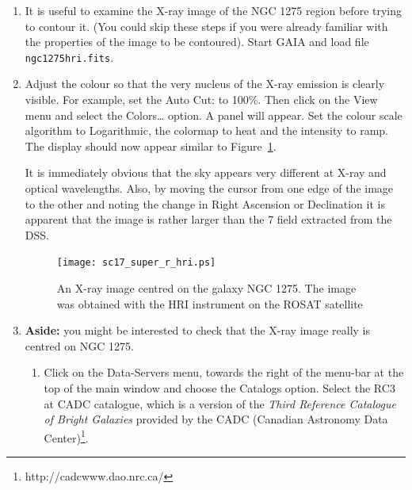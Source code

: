 \documentclass[twoside,11pt]{article}
\newcommand{\arcmin} {\raisebox{-0.5ex}{$^{'}$} }
\newcommand{\htmladdnormallinkfoot}[2]{#1\footnote{#2}}
\begin{document}
\begin{enumerate}

  \item It is useful to examine the X-ray image of the NGC 1275 region
   before trying to contour it.  (You could skip these steps if you
   were already familiar with the properties of the image to be contoured).
   Start GAIA and load file {\tt ngc1275hri.fits}.

  \item Adjust the colour so that the very nucleus of the X-ray emission
   is clearly visible.  For example, set the {\sf Auto Cut:} to 100\%.
   Then click on the {\sf View} menu and select the {\sf
   Colors\ldots} option.  A panel will appear.  Set the colour scale
   algorithm to {\sf Logarithmic}, the colormap to {\sf heat} and the
   intensity to {\sf ramp}.  The display should now appear similar to
   Figure~\ref{SUPER_R_HRI}.

   It is immediately obvious that the sky appears very different at X-ray
   and optical wavelengths.  Also, by moving the cursor from one edge of
   the image to the other and noting the change in Right Ascension or
   Declination it is apparent that the image is rather larger than the
   7\arcmin field extracted from the DSS.

  \begin{figure}[htbp]
     \centering
     \texttt{[image: sc17\_super\_r\_hri.ps]}
     \begin{quote}
     \caption[An X-ray image of NGC 1275]
      {An X-ray image centred on the galaxy NGC 1275.  The image was
      obtained with the HRI instrument on the ROSAT satellite
     \label{SUPER_R_HRI} }
     \end{quote}
  \end{figure}

  \item {\bf Aside:} you might be interested to check that the X-ray
   image really is centred on NGC 1275.

  \begin{enumerate}

    \item Click on the {\sf Data-Servers} menu, towards the right of the
     menu-bar at the top of the main window and choose the {\sf Catalogs}
     option.  Select the {\sf RC3 at CADC} catalogue, which is a version
     of the {\it Third Reference Catalogue of Bright Galaxies}\/\cite{RC3}
     provided by the
     \htmladdnormallinkfoot{CADC (Canadian Astronomy Data Center)}
     {http://cadcwww.dao.nrc.ca/}.


\end{enumerate}
\end{enumerate}
\end{document}
